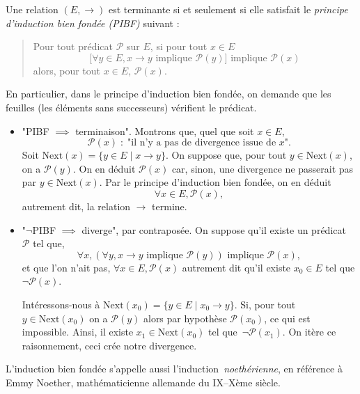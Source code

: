 \documentclass[../main]{subfiles}
\begin{document}
  \begin{thm}
    Une relation $(E, \to)$ est terminante si et seulement si elle satisfait  le \textit{principe d'induction bien fondée (PIBF)} suivant :
    \begin{quote}
      Pour tout prédicat $\mathcal{P}$ sur $E$, si pour tout $x \in E$ \[
        \big[\forall y \in E, x \to y \text{ implique } \mathcal{P}(y)\big] \text{ implique } \mathcal{P}(x)
      \] alors, pour tout $x \in E$, $\mathcal{P}(x)$.
    \end{quote}

    En particulier, dans le principe d'induction bien fondée, on demande que les feuilles (les éléments sans successeurs) vérifient le prédicat.
  \end{thm}
  \begin{prv}
    \begin{itemize}
      \item "PIBF $\implies$ terminaison".
        Montrons que, quel que soit $x \in E$, \[
        \mathcal{P}(x) \; : \; \text{"il n'y a pas de divergence issue de $x$"}
        .\]
        Soit $\mathrm{Next}(x) = \{y \in E  \mid x \to y\}$.
        On suppose que, pour tout $y \in \mathrm{Next}(x)$, on a $\mathcal{P}(y)$.
        On en déduit $\mathcal{P}(x)$ car, sinon, une divergence ne passerait pas par $y \in \mathrm{Next}(x)$.
        Par le principe d'induction bien fondée, on en déduit \[\forall x \in E, \mathcal{P}(x),\] autrement dit, la relation $\to$ termine.
      \item "$\lnot$PIBF  $\implies$ diverge", par contraposée.
        On suppose qu'il existe un prédicat $\mathcal{P}$ tel que, \[
        \forall x, (\forall y, x \to y \text{ implique } \mathcal{P}(y)) \text{ implique }\mathcal{P}(x)
        ,\] et que l'on n'ait pas, $\forall x \in E, \mathcal{P}(x)$ autrement dit qu'il existe $x_0 \in E$ tel que $\lnot \mathcal{P}(x)$.

        Intéressons-nous à $\mathrm{Next}(x_0) = \{ y \in E \mid x_0 \to y\}$.
        Si, pour tout $y \in \mathrm{Next}(x_0)$ on a $\mathcal{P}(y)$ alors par hypothèse $\mathcal{P}(x_0)$, ce qui est impossible.
        Ainsi, il existe $x_1 \in \mathrm{Next}(x_0)$ tel que~$\lnot \mathcal{P}(x_1)$.
        On itère ce raisonnement, ceci crée notre divergence.
    \end{itemize}
  \end{prv}

  \begin{rmk}
    L'induction bien fondée s'appelle aussi l'induction~\textit{noethérienne}, en référence à Emmy Noether, mathématicienne allemande du IX--Xème siècle.
  \end{rmk}
\end{document}
